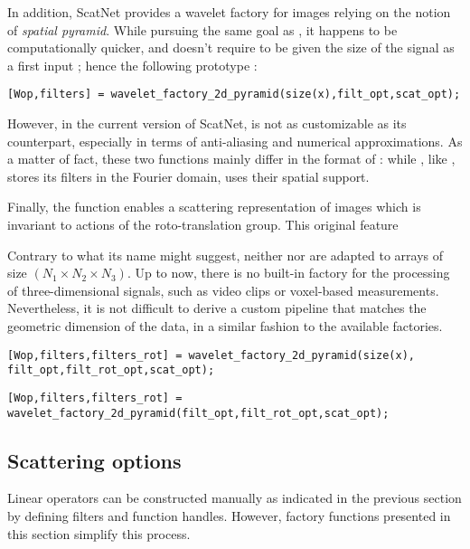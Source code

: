 \documentclass{article}
\begin{document}
In addition, ScatNet provides a wavelet factory for images relying on the notion of \emph{spatial pyramid}. While pursuing the same goal as , it happens to be computationally quicker, and doesn't require to be given the size of the signal  as a first input ; hence the following prototype :

\begin{lstlisting}
[Wop,filters] = wavelet_factory_2d_pyramid(size(x),filt_opt,scat_opt);
\end{lstlisting}

However, in the current version of ScatNet,  is not as customizable as its counterpart, especially in terms of anti-aliasing and numerical approximations. As a matter of fact, these two functions mainly differ in the format of  : while , like , stores its filters in the Fourier domain,  uses their spatial support.

Finally, the function  enables a scattering representation of images which is invariant to actions of the roto-translation group. This original feature 

Contrary to what its name might suggest, neither  nor
 are adapted to arrays of size $(N_1 \times N_2 \times N_3)$. Up to now, there is no built-in factory for the processing of three-dimensional signals, such as video clips or voxel-based measurements. Nevertheless, it is not difficult to derive a custom pipeline that matches the geometric dimension of the data, in a similar fashion to the available factories.

\begin{lstlisting}
[Wop,filters,filters_rot] = wavelet_factory_2d_pyramid(size(x), filt_opt,filt_rot_opt,scat_opt);
\end{lstlisting}

\begin{lstlisting}
[Wop,filters,filters_rot] = wavelet_factory_2d_pyramid(filt_opt,filt_rot_opt,scat_opt);
\end{lstlisting}

\subsection{Scattering options \label{sub:scattering-options}}




Linear operators can be constructed manually as indicated in the previous section by defining filters and function handles. However, factory functions presented in this section simplify this process.
\end{document}
